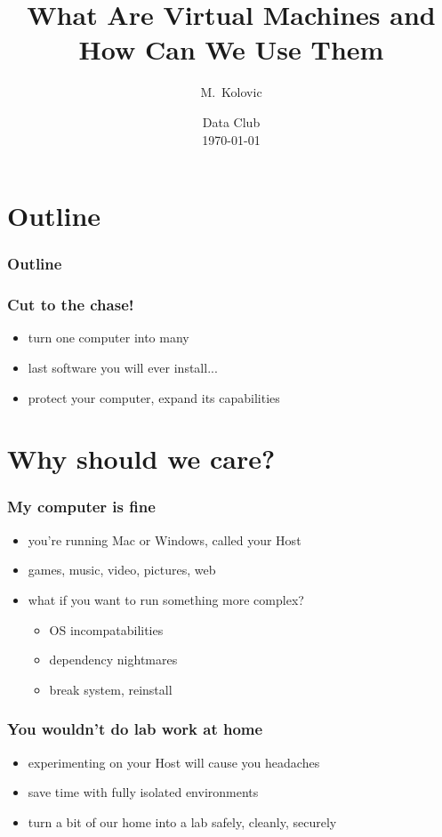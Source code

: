 \documentclass{beamer}
\title[Virtual Machines]
{
    What Are Virtual Machines and How Can We Use Them
}
\author[Kolovic]
{
    M.~Kolovic
}
\institute[UWO]
{
    Robarts Research Institute \\
    University of Western Ontario
}
\date[Summer 2016]
{
    Data Club \\
    \today
}
\begin{document}
\section[Outline]{Outline}

\begin{frame}
    \titlepage
\end{frame}

\begin{frame}
    \frametitle{Outline}
    \tableofcontents
\end{frame}

\begin{frame}
    \frametitle{Cut to the chase!}
    \begin{itemize}
        \item turn one computer into many
        \item last software you will ever install...
        \item protect your computer, expand its capabilities
    \end{itemize}
\end{frame}

\AtBeginSection[]
    {
        \begin{frame}
            \tableofcontents[currentsection]
        \end{frame}
    }
\section[Motivation]{Why should we care?}

\begin{frame}
    \frametitle{My computer is fine}
    \begin{itemize}
        \item you're running Mac or Windows, called your Host 
        \item games, music, video, pictures, web
        \item<2-> what if you want to run something more complex?
            \begin{itemize}
                \item<3-> OS incompatabilities
                \item<3-> dependency nightmares
                \item<3-> break system, reinstall
            \end{itemize}
    \end{itemize}
\end{frame}

\begin{frame}
    \frametitle{You wouldn't do lab work at home}
    \begin{itemize}
        \item experimenting on your Host will cause you headaches
        \item save time with fully isolated environments
        \item turn a bit of our home into a lab safely, cleanly, securely
    \end{itemize}
\end{frame}
\end{document}
